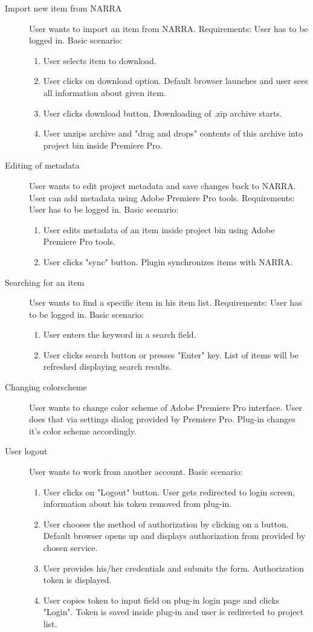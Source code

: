 \documentclass[thesis=B,english]{FITthesis}[2012/10/20]
\begin{document}
\begin{description}
\begin{itemize}
	\end{itemize}
		\item[Import new item from NARRA]
User wants to import an item from NARRA. Requirements: User has to be logged in. Basic scenario:
	\begin{enumerate}
		\item User selects item to download.
		\item User clicks on download option. Default browser launches and user sees all information about given item.
		\item User clicks download button. Downloading of .zip archive starts.
		\item User unzips archive and "drag and drops" contents of this archive into project bin inside Premiere Pro.
	\end{enumerate}
		\item[Editing of metadata]
User wants to edit project metadata and save changes back to NARRA. User can add metadata using Adobe Premiere Pro tools. Requirements: User has to be logged in. Basic scenario:
	\begin{enumerate}
		\item User edits metadata of an item inside project bin using Adobe Premiere Pro tools.
		\item User clicks "sync" button. Plugin synchronizes items with NARRA.
	\end{enumerate}
		\item[Searching for an item]
User wants to find a specific item in his item list. Requirements: User has to be logged in. Basic scenario: 
	\begin{enumerate}
		\item User enters the keyword in a search field.
		\item User clicks search button or presses "Enter" key. List of items will be refreshed displaying search results.
	\end{enumerate}
		\item [Changing colorscheme]
User wants to change color scheme of Adobe Premiere Pro interface. User does that via settings dialog provided by Premiere Pro. Plug-in changes it's color scheme accordingly.
		\item [User logout]
User wants to work from another account. Basic scenario:
	\begin{enumerate}
		\item User clicks on "Logout" button. User gets redirected to login screen, information about his token removed from plug-in.
		\item User chooses the method of authorization by clicking on a button. Default browser opens up and displays authorization from provided by chosen service.
		\item User provides his/her credentials and submits the form. Authorization token is displayed.
		\item User copies token to input field on plug-in login page and clicks "Login". Token is saved inside plug-in and user is redirected to project list. 
	\end{enumerate}
	\end{description}
\end{document}
